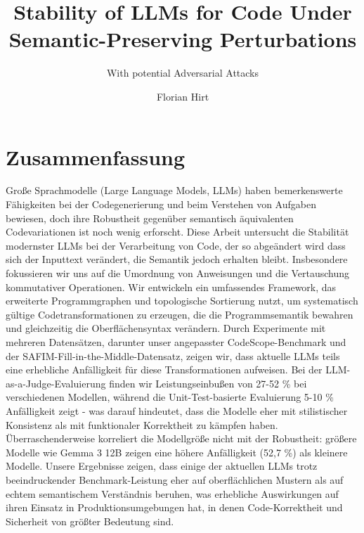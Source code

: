 \documentclass[%
thesis=student,%
coverpage=false,%
titlepage=false,%
headmarks=true, %
english,%
font=libertine, %
math=newpxtx, %
BCOR=5mm,%
coverBCOR=11mm%
]{tum-templates/book/tumbook}
\title{Stability of LLMs for Code Under Semantic-Preserving Perturbations}
\subtitle{With potential Adversarial Attacks}
\author{Florian Hirt}
\begin{document}
\frontmatter
\maketitle

\section*{Zusammenfassung}
Große Sprachmodelle (Large Language Models, LLMs) haben bemerkenswerte Fähigkeiten bei der Codegenerierung und beim Verstehen von Aufgaben bewiesen, doch ihre Robustheit gegenüber semantisch äquivalenten Codevariationen ist noch wenig erforscht. Diese Arbeit untersucht die Stabilität modernster LLMs bei der Verarbeitung von Code, der so abgeändert wird dass sich der Inputtext verändert, die Semantik jedoch erhalten bleibt. Insbesondere fokussieren wir uns auf die Umordnung von Anweisungen und die Vertauschung kommutativer Operationen. Wir entwickeln ein umfassendes Framework, das erweiterte Programmgraphen und topologische Sortierung nutzt, um systematisch gültige Codetransformationen zu erzeugen, die die Programmsemantik bewahren und gleichzeitig die Oberflächensyntax verändern. Durch Experimente mit mehreren Datensätzen, darunter unser angepasster CodeScope-Benchmark und der SAFIM-Fill-in-the-Middle-Datensatz, zeigen wir, dass aktuelle LLMs teils eine erhebliche Anfälligkeit für diese Transformationen aufweisen. Bei der LLM-as-a-Judge-Evaluierung finden wir Leistungseinbußen von 27-52 \% bei verschiedenen Modellen, während die Unit-Test-basierte Evaluierung 5-10 \% Anfälligkeit zeigt - was darauf hindeutet, dass die Modelle eher mit stilistischer Konsistenz als mit funktionaler Korrektheit zu kämpfen haben. Überraschenderweise korreliert die Modellgröße nicht mit der Robustheit: größere Modelle wie Gemma 3 12B zeigen eine höhere Anfälligkeit (52,7 \%) als kleinere Modelle. Unsere Ergebnisse zeigen, dass einige der aktuellen LLMs trotz beeindruckender Benchmark-Leistung eher auf oberflächlichen Mustern als auf echtem semantischem Verständnis beruhen, was erhebliche Auswirkungen auf ihren Einsatz in Produktionsumgebungen hat, in denen Code-Korrektheit und Sicherheit von größter Bedeutung sind.
\end{document}
